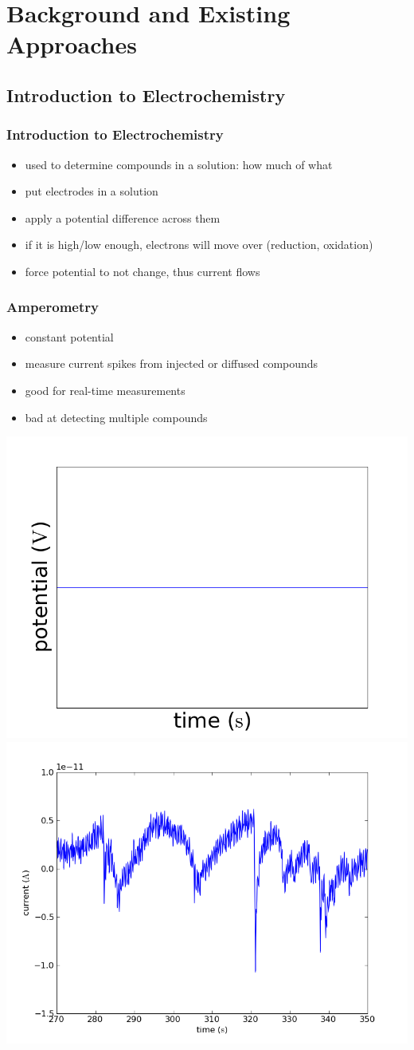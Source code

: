 \documentclass[10pt]{beamer}
\begin{document}
\section{Background and Existing Approaches}
\subsection{Introduction to Electrochemistry}
\begin{frame}
	\frametitle{Introduction to Electrochemistry}
	\begin{itemize}
		\item used to determine compounds in a solution: how much of what
		\item put electrodes in a solution
		\item apply a potential difference across them
		\item if it is high/low enough, electrons will move over (reduction, oxidation)
		\item force potential to not change, thus current flows
	\end{itemize}
\end{frame}

\begin{frame}
	\frametitle{Amperometry}
	\begin{itemize}
		\item constant potential
		\item measure current spikes from injected or diffused compounds
		\item good for real-time measurements
		\item bad at detecting multiple compounds
	\end{itemize}
	\includegraphics[width=0.5\linewidth]{figures/amperometry.png}
	\includegraphics[width=0.5\linewidth]{figures/216.png}
\end{frame}
\end{document}

